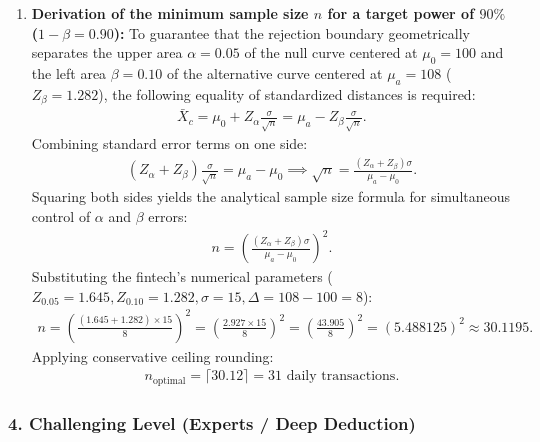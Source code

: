 \begin{solproblema}
\begin{enumerate}
		\item \textbf{Derivation of the minimum sample size $n$ for a target power of $90\%$ ($1-\beta = 0.90$):}
		To guarantee that the rejection boundary geometrically separates the upper area $\alpha = 0.05$ of the null curve centered at $\mu_0 = 100$ and the left area $\beta = 0.10$ of the alternative curve centered at $\mu_a = 108$ ($Z_\beta = 1.282$), the following equality of standardized distances is required:
		\begin{align}
			\bar{X}_c = \mu_0 + Z_\alpha \frac{\sigma}{\sqrt{n}} = \mu_a - Z_\beta \frac{\sigma}{\sqrt{n}}.
		\end{align}
		Combining standard error terms on one side:
		\begin{align}
			(Z_\alpha + Z_\beta)\frac{\sigma}{\sqrt{n}} = \mu_a - \mu_0 \implies \sqrt{n} = \frac{(Z_\alpha + Z_\beta)\sigma}{\mu_a - \mu_0}.
		\end{align}
		Squaring both sides yields the analytical sample size formula for simultaneous control of $\alpha$ and $\beta$ errors:
		\begin{align}
			n = \left( \frac{(Z_\alpha + Z_\beta)\sigma}{\mu_a - \mu_0} \right)^2.
		\end{align}
		Substituting the fintech's numerical parameters ($Z_{0.05} = 1.645, Z_{0.10} = 1.282, \sigma = 15, \Delta = 108 - 100 = 8$):
		\begin{align}
			n = \left( \frac{(1.645 + 1.282) \times 15}{8} \right)^2 = \left( \frac{2.927 \times 15}{8} \right)^2 = \left( \frac{43.905}{8} \right)^2 = (5.488125)^2 \approx 30.1195.
		\end{align}
		Applying conservative ceiling rounding:
		\begin{align}
			n_{\text{optimal}} = \lceil 30.12 \rceil = 31 \text{ daily transactions.}
		\end{align}
	\end{enumerate}
\end{solproblema}

\subsubsection*{4. Challenging Level (Experts / Deep Deduction)}

